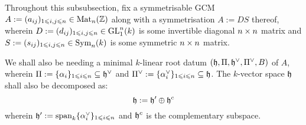             \begin{convention} \label{conv: generalised_killing_forms}
                Throughout this subsubsection, fix a symmetrisable GCM $A := (a_{ij})_{1 \leqslant i, j \leqslant n} \in \mathrm{Mat}_n(\mathbb{Z})$ along with a symmetrisation $A := DS$ thereof, wherein $D := (d_{ij})_{1 \leqslant i, j \leqslant n} \in \mathrm{GL}_1^n(k)$ is some invertible diagonal $n \x n$ matrix and $S := (s_{ij})_{1 \leqslant i, j \leqslant n} \in \mathrm{Sym}_n(k)$ is some symmetric $n \x n$ matrix. 
                
                We shall also be needing a minimal $k$-linear root datum $(\mathfrak{h}, \Pi, \mathfrak{h}^{\vee}, \Pi^{\vee}, B)$ of $A$, wherein $\Pi := \{\alpha_i\}_{1 \leqslant i \leqslant n} \subseteq \mathfrak{h}^{\vee}$ and $\Pi^{\vee} := \{\alpha_i^{\vee}\}_{1 \leqslant i \leqslant n} \subseteq \mathfrak{h}$. The $k$-vector space $\mathfrak{h}$ shall also be decomposed as:
                    $$\mathfrak{h} := \mathfrak{h}' \oplus \mathfrak{h}^c$$
                wherein $\mathfrak{h}' := \operatorname{span}_k \{\alpha_i^{\vee}\}_{1 \leqslant i \leqslant n}$ and $\mathfrak{h}^c$ is the complementary subspace. 
            \end{convention}
            
